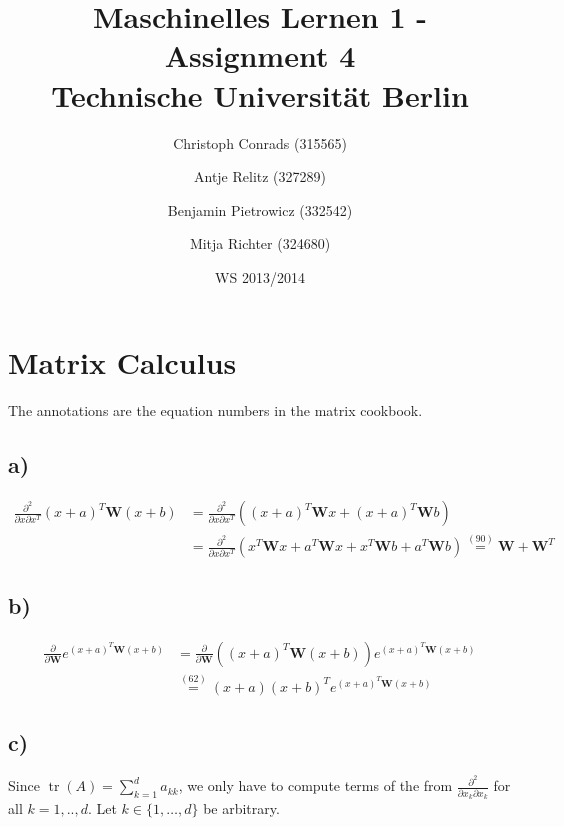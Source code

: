 \documentclass[paper=a4,fontsize=10pt,DIV11,BCOR10mm]{scrartcl}
\DeclareMathOperator{\tr}{tr}
\begin{document}
\title{Maschinelles Lernen 1 - Assignment 4\\
\small{Technische Universität Berlin}}


\author{\small{Christoph Conrads (315565)}\and \small{Antje Relitz (327289)}  \and \small{Benjamin Pietrowicz (332542)} \and \small{Mitja Richter (324680)} }

\date{WS 2013/2014}

\maketitle


\section{Matrix Calculus}
The annotations are the equation numbers in the matrix cookbook.

\subsection*{a)}
\begin{align*}
\frac{\partial^2}{\partial x \partial x^T}(x+a)^T \mathbf{W}(x+b) &= \frac{\partial^2}{\partial x \partial x^T} ((x+a)^T \mathbf{W}x + (x+a)^T \mathbf{W}b)\\
&= \frac{\partial^2}{\partial x \partial x^T} (x^T\mathbf{W}x + a^T\mathbf{W}x + x^T\mathbf{W}b + a^T\mathbf{W}b) \stackrel{(90)}{=} \mathbf{W} + \mathbf{W}^T 
\end{align*}

\subsection*{b)}

\begin{align*}
 \frac{\partial}{\partial\mathbf{W}}e^{(x+a)^T\mathbf{W}(x+b)} &= \frac{\partial}{\partial\mathbf{W}}((x+a)^T\mathbf{W}(x+b)) e^{(x+a)^T\mathbf{W}(x+b)} \\
 &\stackrel{(62)}{=} (x+a)(x+b)^Te^{(x+a)^T\mathbf{W}(x+b)}
\end{align*}

\subsection*{c)}

Since $\tr(A)=\sum_{k=1}^d a_{kk}$, we only have to compute terms of the from $\frac{\partial^2}{\partial x_k\partial x_k}$ for all $k=1,..,d$. Let $k\in\{1,\dots,d\}$ be arbitrary.
\end{document}
